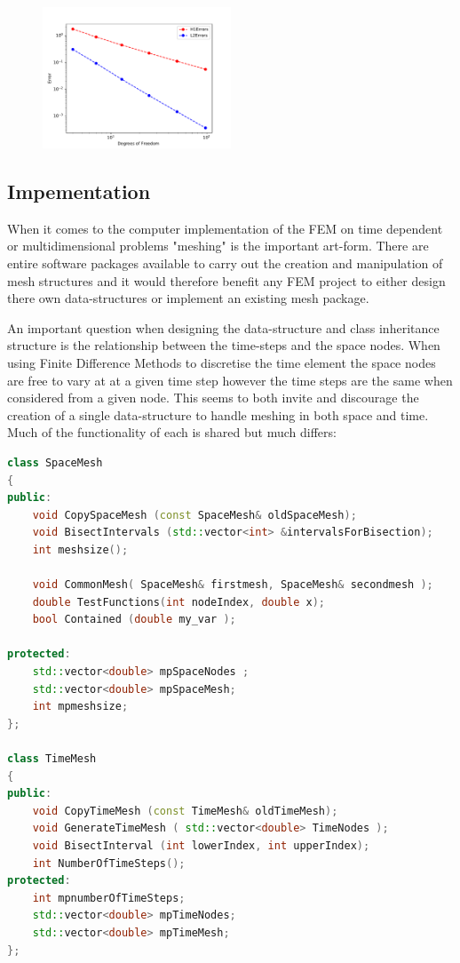 \documentclass{uonmathreport}
\theoremstyle{definition}
\theoremstyle{problem}
\theoremstyle{theorem}
\begin{document}
\begin{figure}[h]
   \includegraphics[width=0.5\textwidth]{ParabolicConvergencesOriginal.pdf}
   
 \label{fig:paraconvergences1}
\end{figure}






\subsection{Impementation} \label{subsubsec:Implementation}

When it comes to the computer implementation of the FEM on time dependent or multidimensional problems "meshing" is the important art-form. There are entire software packages available to carry out the creation and manipulation of mesh structures and it would therefore benefit any FEM project to either design there own data-structures or implement an existing mesh package. 

An important question when designing the data-structure and class inheritance structure is the relationship between the time-steps and the space nodes. When using Finite Difference Methods to discretise the time element the space nodes are free to vary at at a given time step however the time steps are the same when considered from a given node. This seems to both invite and discourage the creation of a single data-structure to handle meshing in both space and time. Much of the functionality of each is shared but much differs:

\begin{lstlisting}[language=C++]
class SpaceMesh
{
public:
    void CopySpaceMesh (const SpaceMesh& oldSpaceMesh);
    void BisectIntervals (std::vector<int> &intervalsForBisection);
    int meshsize();

    void CommonMesh( SpaceMesh& firstmesh, SpaceMesh& secondmesh );
    double TestFunctions(int nodeIndex, double x);
    bool Contained (double my_var );

protected:
    std::vector<double> mpSpaceNodes ;
    std::vector<double> mpSpaceMesh;
    int mpmeshsize;
};

class TimeMesh
{
public:
    void CopyTimeMesh (const TimeMesh& oldTimeMesh);
    void GenerateTimeMesh ( std::vector<double> TimeNodes );
    void BisectInterval (int lowerIndex, int upperIndex);
    int NumberOfTimeSteps();
protected:
    int mpnumberOfTimeSteps;
    std::vector<double> mpTimeNodes;
    std::vector<double> mpTimeMesh;
};


\end{lstlisting}
\end{document}
